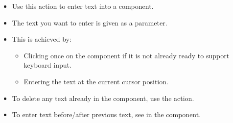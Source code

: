 \begin{itemize}
\item Use this action to enter text into a component.
\item The text you want to enter is given as a parameter.
\item This is achieved by:
\begin{itemize}
\item Clicking once on the component if it is not already ready to support keyboard input.
\item Entering the text at the current cursor position.
\end{itemize}
\item To delete any text already in the component, use the action.
\item To enter text before/after previous text, see  in the  component.
\end{itemize}




